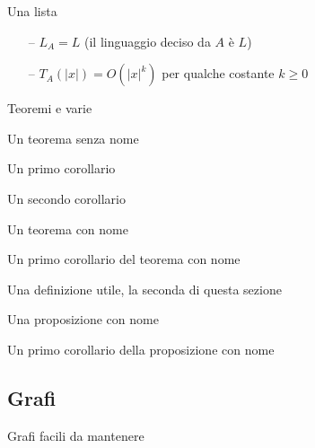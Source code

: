 Una lista
\begin{itemize}[noitemsep,parsep=0pt,partopsep=0pt,topsep=0pt]
    \item[--] $L_A = L$ (il linguaggio deciso da $A$ è $L$)
    \item[--] $T_A(|x|) = O(|x|^k)$ per qualche costante $k \geq 0$
\end{itemize}

Teoremi e varie

\begin{theorem}
    Un teorema senza nome
\end{theorem}

\begin{corollario}
    Un primo corollario
\end{corollario}

\begin{corollario}
    Un secondo corollario
\end{corollario}

\begin{theorem}
    Un teorema con nome
\end{theorem}

\begin{corollario}
    Un primo corollario del teorema con nome
\end{corollario}

\begin{definition}
    Una definizione utile, la seconda di questa sezione
\end{definition}

\begin{proposizione}
    Una proposizione con nome
\end{proposizione}

\begin{corollario}
    Un primo corollario della proposizione con nome
\end{corollario}

\subsection{Grafi}

Grafi facili da mantenere


